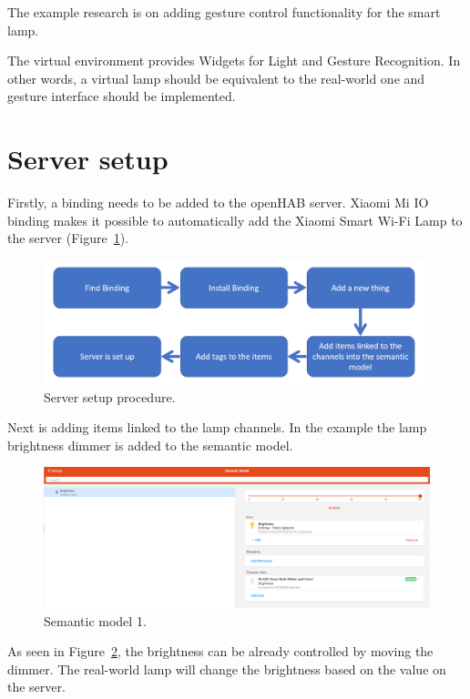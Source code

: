 The example research is on adding gesture control functionality for the smart lamp.

The virtual environment provides Widgets for Light and Gesture Recognition. In other words, a virtual lamp should be equivalent to the real-world one and gesture interface should be implemented.

\section{Server setup}
Firstly, a binding needs to be added to the openHAB server. Xiaomi Mi IO binding makes it possible to automatically add the Xiaomi Smart Wi-Fi Lamp to the server (Figure~\ref{fig:ServerSetupProcedure-figure}).

\begin{figure}
  \centering
  \includegraphics[width=0.9\linewidth]{figures/ServerSetupProcedure.png}
  \caption{Server setup procedure.}
  \label{fig:ServerSetupProcedure-figure}
\end{figure}

Next is adding items linked to the lamp channels. In the example the lamp brightness dimmer is added to the semantic model.

\begin{figure}
  \centering
  \includegraphics[width=0.9\linewidth]{figures/SemanticModelOne.png}
  \caption{Semantic model 1.}
  \label{fig:SemanticModelOne-figure}
\end{figure}

As seen in Figure~\ref{fig:SemanticModelOne-figure}, the brightness can be already controlled by moving the dimmer. The real-world lamp will change the brightness based on the value on the server.

